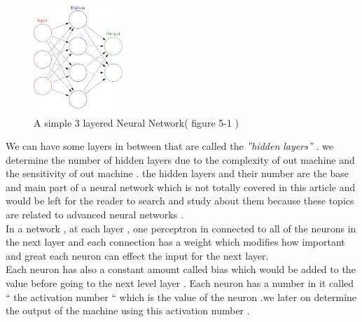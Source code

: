 \documentclass[12pt , a4paper]{article}
\begin{document}
\begin{figure}[h]
\centering
\includegraphics[width=0.3\textwidth,frame]{nn.png}
\caption*{A simple 3 layered Neural Network( figure 5-1 )}
\label{f-5-1}
\end{figure}

We can have some layers in between that are called the \textit{''hidden layers''} . we determine the number of hidden layers due to the complexity of out machine and the sensitivity of out machine . the hidden layers and their number are the base and main part of a neural network which is not totally covered in this article and would be left for the reader to search and study about them because these topics are related to advanced neural networks . \\
In a network , at each layer , one perceptron in connected to all of the neurons in the next layer and each connection has a weight which modifies how important and great each neuron can effect the input for the next layer. \\
Each neuron has also a constant amount called bias which would be added to the value before going to the next level layer . Each neuron has a number in it called “ the activation number “ which is the value of the neuron .we later on determine the output of the machine using this activation number . 
\end{document}
